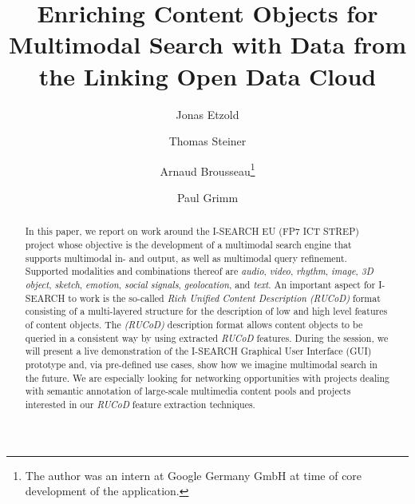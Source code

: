\documentclass[runningheads,a4paper]{llncs}
\begin{document}
\mainmatter

\title{Enriching Content Objects for Multimodal Search with Data from the Linking Open Data Cloud}

\author{Jonas Etzold \and Thomas Steiner \and Arnaud Brousseau\thanks{The author was an intern at Google Germany GmbH at time of core development of the application.} \and Paul Grimm}


\maketitle

\begin{abstract}
In this paper, we report on work around the \mbox{I-SEARCH} EU (FP7 ICT STREP) project
whose objective is the development of a multimodal search engine that supports multimodal
in- and output, as well as multimodal  query refinement.
Supported modalities and combinations thereof are \emph{audio}, \emph{video},
\emph{rhythm}, \emph{image}, \emph{3D object}, \emph{sketch}, \emph{emotion},
\emph{social signals}, \emph{geolocation}, and \emph{text}.
An important aspect for \mbox{I-SEARCH} to work is the so-called
\emph{Rich Unified Content Description} \emph{\mbox{(RUCoD)}} format
consisting of a multi-layered structure
for the description of low and high level features of content objects.
The \emph{\mbox{(RUCoD)}} description format allows content objects
to be queried in a consistent way by using extracted \mbox{\emph{RUCoD}} features.
During the session, we will present a live demonstration of the \mbox{I-SEARCH}
Graphical User Interface (GUI) prototype and, via pre-defined use cases,
show how we imagine multimodal search in the future.
We are especially looking for networking opportunities with projects dealing with
semantic annotation of large-scale multimedia content pools and 
projects interested in our \emph{RUCoD} feature extraction techniques.
\end{abstract}



\end{document}
